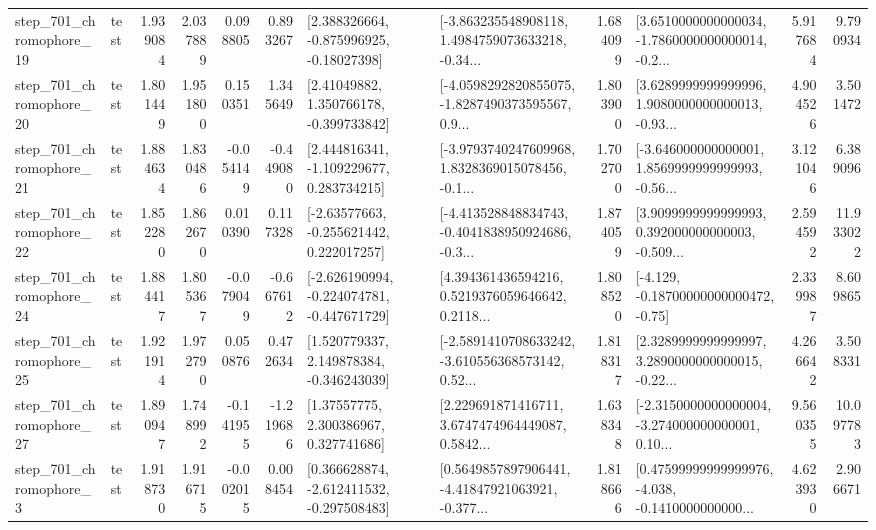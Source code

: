\begin{tabular}{llrrrrllrlrr}
  step\_701\_chromophore\_19 &      test &      1.939084 &    2.037889 &      0.098805 &  0.893267 &    [2.388326664, -0.875996925, -0.18027398] &  [-3.863235548908118, 1.4984759073633218, -0.34... &       1.684099 &  [3.6510000000000034, -1.7860000000000014, -0.2... &            5.917684 &          9.790934 \\
  step\_701\_chromophore\_20 &      test &      1.801449 &    1.951800 &      0.150351 &  1.345649 &     [2.41049882, 1.350766178, -0.399733842] &  [-4.0598292820855075, -1.8287490373595567, 0.9... &       1.803900 &  [3.6289999999999996, 1.9080000000000013, -0.93... &            4.904526 &          3.501472 \\
  step\_701\_chromophore\_21 &      test &      1.884634 &    1.830486 &     -0.054149 & -0.449080 &    [2.444816341, -1.109229677, 0.283734215] &  [-3.9793740247609968, 1.8328369015078456, -0.1... &       1.702700 &  [-3.646000000000001, 1.8569999999999993, -0.56... &            3.121046 &          6.389096 \\
  step\_701\_chromophore\_22 &      test &      1.852280 &    1.862670 &      0.010390 &  0.117328 &    [-2.63577663, -0.255621442, 0.222017257] &  [-4.413528848834743, -0.4041838950924686, -0.3... &       1.874059 &  [3.9099999999999993, 0.392000000000003, -0.509... &            2.594592 &         11.933022 \\
  step\_701\_chromophore\_24 &      test &      1.884417 &    1.805367 &     -0.079049 & -0.667612 &  [-2.626190994, -0.224074781, -0.447671729] &  [4.394361436594216, 0.5219376059646642, 0.2118... &       1.808520 &              [-4.129, -0.18700000000000472, -0.75] &            2.339987 &          8.609865 \\
  step\_701\_chromophore\_25 &      test &      1.921914 &    1.972790 &      0.050876 &  0.472634 &    [1.520779337, 2.149878384, -0.346243039] &  [-2.5891410708633242, -3.610556368573142, 0.52... &       1.818317 &  [2.3289999999999997, 3.2890000000000015, -0.22... &            4.266642 &          3.508331 \\
  step\_701\_chromophore\_27 &      test &      1.890947 &    1.748992 &     -0.141955 & -1.219686 &      [1.37557775, 2.300386967, 0.327741686] &  [2.229691871416711, 3.6747474964449087, 0.5842... &       1.638348 &  [-2.3150000000000004, -3.274000000000001, 0.10... &            9.560355 &         10.097783 \\
   step\_701\_chromophore\_3 &      test &      1.918730 &    1.916715 &     -0.002015 &  0.008454 &   [0.366628874, -2.612411532, -0.297508483] &  [0.5649857897906441, -4.41847921063921, -0.377... &       1.818666 &  [0.47599999999999976, -4.038, -0.1410000000000... &            4.623930 &          2.906671 \\

\end{tabular}
